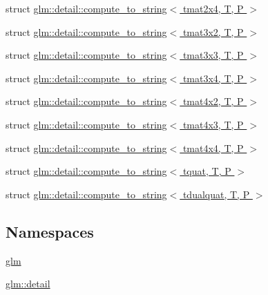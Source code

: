 \begin{DoxyCompactItemize}
\item 
struct \hyperlink{structglm_1_1detail_1_1compute__to__string_3_01tmat2x4_00_01_t_00_01_p_01_4}{glm\+::detail\+::compute\+\_\+to\+\_\+string$<$ tmat2x4, T, P $>$}
\item 
struct \hyperlink{structglm_1_1detail_1_1compute__to__string_3_01tmat3x2_00_01_t_00_01_p_01_4}{glm\+::detail\+::compute\+\_\+to\+\_\+string$<$ tmat3x2, T, P $>$}
\item 
struct \hyperlink{structglm_1_1detail_1_1compute__to__string_3_01tmat3x3_00_01_t_00_01_p_01_4}{glm\+::detail\+::compute\+\_\+to\+\_\+string$<$ tmat3x3, T, P $>$}
\item 
struct \hyperlink{structglm_1_1detail_1_1compute__to__string_3_01tmat3x4_00_01_t_00_01_p_01_4}{glm\+::detail\+::compute\+\_\+to\+\_\+string$<$ tmat3x4, T, P $>$}
\item 
struct \hyperlink{structglm_1_1detail_1_1compute__to__string_3_01tmat4x2_00_01_t_00_01_p_01_4}{glm\+::detail\+::compute\+\_\+to\+\_\+string$<$ tmat4x2, T, P $>$}
\item 
struct \hyperlink{structglm_1_1detail_1_1compute__to__string_3_01tmat4x3_00_01_t_00_01_p_01_4}{glm\+::detail\+::compute\+\_\+to\+\_\+string$<$ tmat4x3, T, P $>$}
\item 
struct \hyperlink{structglm_1_1detail_1_1compute__to__string_3_01tmat4x4_00_01_t_00_01_p_01_4}{glm\+::detail\+::compute\+\_\+to\+\_\+string$<$ tmat4x4, T, P $>$}
\item 
struct \hyperlink{structglm_1_1detail_1_1compute__to__string_3_01tquat_00_01_t_00_01_p_01_4}{glm\+::detail\+::compute\+\_\+to\+\_\+string$<$ tquat, T, P $>$}
\item 
struct \hyperlink{structglm_1_1detail_1_1compute__to__string_3_01tdualquat_00_01_t_00_01_p_01_4}{glm\+::detail\+::compute\+\_\+to\+\_\+string$<$ tdualquat, T, P $>$}
\end{DoxyCompactItemize}
\subsection*{Namespaces}
\begin{DoxyCompactItemize}
\item 
 \hyperlink{namespaceglm}{glm}
\item 
 \hyperlink{namespaceglm_1_1detail}{glm\+::detail}
\end{DoxyCompactItemize}
